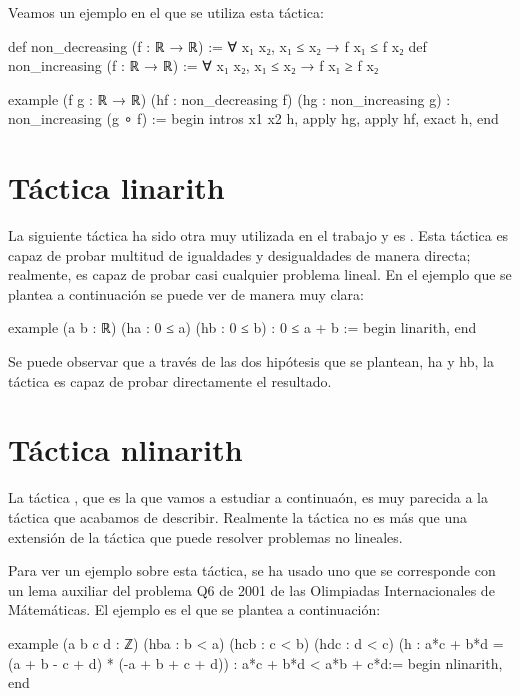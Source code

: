 Veamos un ejemplo en el que se utiliza esta táctica:
\begin{leancode}
def non_decreasing (f : ℝ → ℝ) := ∀ x₁ x₂, x₁ ≤ x₂ → f x₁ ≤ f x₂
def non_increasing (f : ℝ → ℝ) := ∀ x₁ x₂, x₁ ≤ x₂ → f x₁ ≥ f x₂

example (f g : ℝ → ℝ) (hf : non_decreasing f) (hg : non_increasing g) :
non_increasing (g ∘ f) :=
begin
  intros x1 x2 h,
  apply hg,
  apply hf,
  exact h,
end
\end{leancode}

\section{Táctica linarith}

La siguiente táctica ha sido otra muy utilizada en el trabajo y es
. Esta táctica es capaz de probar multitud
de igualdades y desigualdades de manera directa; realmente, es capaz de
probar casi cualquier problema lineal. En el ejemplo que se plantea a
continuación se puede ver de manera muy clara:

\begin{leancode}
example (a b : ℝ) (ha : 0 ≤ a) (hb : 0 ≤ b) : 0 ≤ a + b :=
begin
  linarith,
end
\end{leancode}

Se puede observar que a través de las dos hipótesis que se plantean, ha
y hb, la táctica  es capaz de probar
directamente el resultado.

\section{Táctica nlinarith}

La táctica , que es la que vamos a
estudiar a continuaón, es muy parecida a la táctica
 que acabamos de describir. Realmente la
táctica  no es más que una extensión de
la táctica  que puede resolver problemas no
lineales.

Para ver un ejemplo sobre esta táctica, se ha usado uno que se
corresponde con un lema auxiliar del problema Q6 de 2001 de las
Olimpiadas Internacionales de Mátemáticas. El ejemplo es el que se
plantea a continuación:

\begin{leancode}
example (a b c d : ℤ)
  (hba : b < a)
  (hcb : c < b)
  (hdc : d < c)
  (h : a*c + b*d = (a + b - c + d) * (-a + b + c + d))
  : a*c + b*d < a*b + c*d:=
begin
  nlinarith,
end
\end{leancode}

